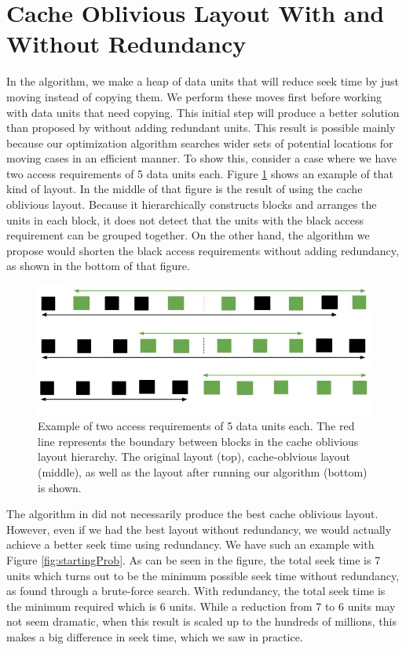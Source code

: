 
\section{Cache Oblivious Layout With and Without Redundancy}

In the algorithm, we make a heap of data units that will reduce seek time by
just moving instead of copying them. We perform these moves first before
working with data units that need copying. This initial step will produce a
better solution than proposed by \cite{cacheobliviouslayout} without adding
redundant units. This result is possible mainly because our optimization
algorithm searches wider sets of potential locations for moving cases in an
efficient manner.
To show this, consider a case where we have two
access requirements of 5 data units each. Figure \ref{YoonImprovement} shows an
example of that kind of layout. In the middle of that figure is the result of
using the cache oblivious layout. Because it hierarchically constructs blocks
and arranges the units in each block, it does
not detect that the
units with the black access requirement can be grouped together. On the other
hand, the algorithm we propose would shorten the black access requirements
without adding redundancy, as shown in the bottom of that figure.

\begin{figure}[ht]
\centering
\includegraphics[width=\columnwidth]{ImprovementOverYoon.jpg}
\caption{Example of two access requirements of 5 data units each. The red line represents the boundary between blocks in the cache oblivious layout hierarchy. The original layout (top), cache-oblvious layout (middle), as well as the layout after running our algorithm (bottom) is shown.}
\label{YoonImprovement}
\end{figure}

The algorithm in \cite{cacheobliviouslayout} did not necessarily produce the best cache oblivious layout. However, even if we had the best layout without redundancy, we would actually achieve a better seek time using redundancy. We have such an example with Figure \ref{fig:startingProb}. As can be seen in the figure, the total seek time is 7 units which turns out to be the minimum possible seek time without redundancy, as found through a brute-force search. With redundancy, the total seek time is the minimum required which is 6 units. While a reduction from 7 to 6 units may not seem dramatic, when this result is scaled up to the hundreds of millions, this makes a big difference in seek time, which we saw in practice.\\


